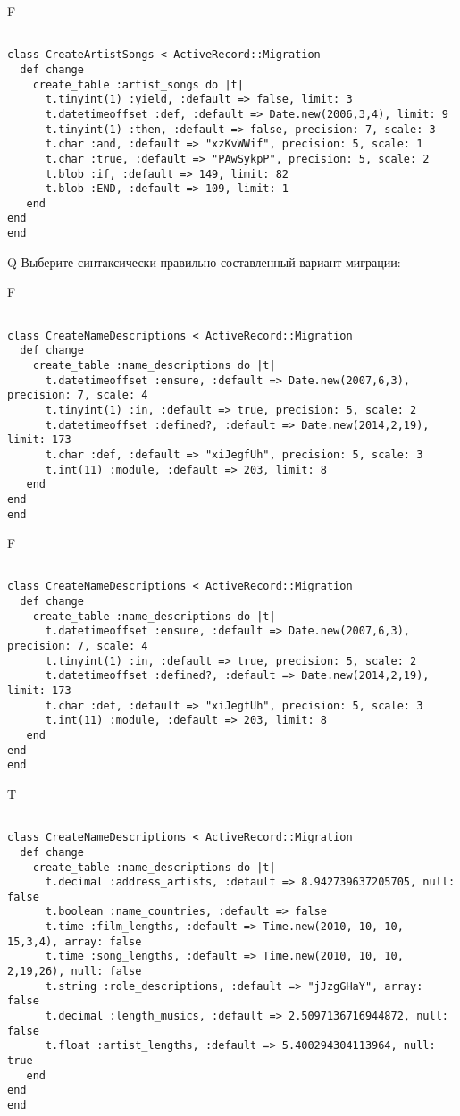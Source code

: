 F
\begin{verbatim}
		
class CreateArtistSongs < ActiveRecord::Migration 
  def change 
    create_table :artist_songs do |t| 
      t.tinyint(1) :yield, :default => false, limit: 3
      t.datetimeoffset :def, :default => Date.new(2006,3,4), limit: 9
      t.tinyint(1) :then, :default => false, precision: 7, scale: 3
      t.char :and, :default => "xzKvWWif", precision: 5, scale: 1
      t.char :true, :default => "PAwSykpP", precision: 5, scale: 2
      t.blob :if, :default => 149, limit: 82
      t.blob :END, :default => 109, limit: 1
   end
end
end
\end{verbatim}

Q
Выберите синтаксически правильно составленный вариант миграции:

F
\begin{verbatim}
		
class CreateNameDescriptions < ActiveRecord::Migration 
  def change 
    create_table :name_descriptions do |t| 
      t.datetimeoffset :ensure, :default => Date.new(2007,6,3), precision: 7, scale: 4
      t.tinyint(1) :in, :default => true, precision: 5, scale: 2
      t.datetimeoffset :defined?, :default => Date.new(2014,2,19), limit: 173
      t.char :def, :default => "xiJegfUh", precision: 5, scale: 3
      t.int(11) :module, :default => 203, limit: 8
   end
end
end
\end{verbatim}

F
\begin{verbatim}
		
class CreateNameDescriptions < ActiveRecord::Migration 
  def change 
    create_table :name_descriptions do |t| 
      t.datetimeoffset :ensure, :default => Date.new(2007,6,3), precision: 7, scale: 4
      t.tinyint(1) :in, :default => true, precision: 5, scale: 2
      t.datetimeoffset :defined?, :default => Date.new(2014,2,19), limit: 173
      t.char :def, :default => "xiJegfUh", precision: 5, scale: 3
      t.int(11) :module, :default => 203, limit: 8
   end
end
end
\end{verbatim}

T
\begin{verbatim}
		
class CreateNameDescriptions < ActiveRecord::Migration 
  def change 
    create_table :name_descriptions do |t| 
      t.decimal :address_artists, :default => 8.942739637205705, null: false
      t.boolean :name_countries, :default => false
      t.time :film_lengths, :default => Time.new(2010, 10, 10, 15,3,4), array: false
      t.time :song_lengths, :default => Time.new(2010, 10, 10, 2,19,26), null: false
      t.string :role_descriptions, :default => "jJzgGHaY", array: false
      t.decimal :length_musics, :default => 2.5097136716944872, null: false
      t.float :artist_lengths, :default => 5.400294304113964, null: true
   end
end
end
\end{verbatim}

